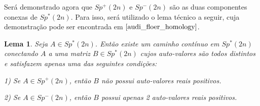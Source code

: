 \documentclass[12pt]{book}
\newtheorem{lema}[teorema]{Lema}
\newcommand{\gruposimpleticonaodegenerado}[1]{Sp^{#1}(2n)}
\begin{document}
	Será demonstrado agora que $\gruposimpleticonaodegenerado{+}$ e  $\gruposimpleticonaodegenerado{-}$ são as duas componentes conexas de $\gruposimpleticonaodegenerado{*}$. Para isso, será utilizado o lema técnico a seguir, cuja demonstração pode ser encontrada em  $\cite{audi_floer_homology}$.
	
	\begin{lema}\label{lema_conectividade_grupo_simlpetico_nao_degenerado}
		Seja $A\in \gruposimpleticonaodegenerado{*}$. Então existe um caminho contínuo em $\gruposimpleticonaodegenerado{*}$ conectando $A$ a uma matriz $B \in \gruposimpleticonaodegenerado{*}$ cujos  auto-valores são todos distintos e satisfazem apenas uma das seguintes condições: 
		
		1) Se $A\in \gruposimpleticonaodegenerado{+}$, então $B$ não possui auto-valores reais positivos.
		
		2) Se $A\in \gruposimpleticonaodegenerado{-}$, então $B$ possui apenas 2 auto-valores reais positivos.
	\end{lema}
	
\end{document}
